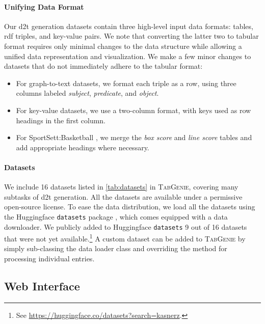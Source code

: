 \paragraph{Unifying Data Format} Our \ac{d2t} generation datasets contain three high-level input data formats: tables, \acs{rdf} triples, and key-value pairs. We note that converting the latter two to tabular format requires only minimal changes to the data structure while allowing a unified data representation and visualization. We make a few minor changes to datasets that do not immediately adhere to the tabular format:

\begin{itemize}
    \item For graph-to-text datasets, we format each triple as a row, using three columns labeled \textit{subject}, \textit{predicate}, and \textit{object}.
    \item For key-value datasets, we use a two-column format, with keys used as row headings in the first column.
    \item For SportSett:Basketball \cite{thomson2020sportsett}, we merge the \textit{box score} and \textit{line score} tables and add appropriate headings where necessary.
\end{itemize}



\paragraph{Datasets}
We include 16 datasets listed in \autoref{tab:datasets} in \textsc{TabGenie}, covering many subtasks of \ac{d2t} generation. All the datasets are available under a permissive open-source license. To ease the data distribution, we load all the datasets using the Huggingface \texttt{datasets} package \cite{lhoest2021datasets}, which comes equipped with a data downloader. We publicly added to Huggingface \texttt{datasets} 9 out of 16 datasets that were not yet available.\footnote{See \url{https://huggingface.co/datasets?search=kasnerz}.} A custom dataset can be added to \textsc{TabGenie} by simply sub-classing the data loader class and overriding the method for processing individual entries.

\subsection{Web Interface}
\label{sec:tabgenie:web}

